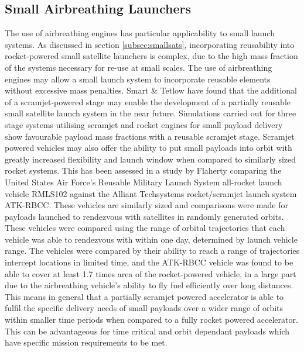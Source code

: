   

\subsection{Small Airbreathing Launchers}

The use of airbreathing engines has particular applicability to small launch systems. As discussed in section \ref{subsec:smallsats}, incorporating reusability into rocket-powered small satellite launchers is complex, due to the high mass fraction of the systems necessary for re-use at small scales. 
The use of airbreathing engines may allow a small launch system to incorporate reusable elements without excessive mass penalties. 
   Smart \& Tetlow\cite{Smart2009} have found that the additional of a scramjet-powered stage may enable the development of a partially reusable small satellite launch system in the near future. 
Simulations carried out for three stage systems utilising scramjet and rocket engines for small payload delivery show favourable payload mass fractions with a reusable scramjet stage\cite{Smart2009}. Scramjet powered vehicles may also offer the ability to put small payloads into orbit with greatly increased flexibility and launch window when compared to similarly sized rocket systems. This has been assessed in a study by Flaherty\cite{Flaherty2010} comparing the United States Air Force's Reusable Military Launch System all-rocket launch vehicle RMLS102 against the Alliant Techsystems rocket/scramjet launch system ATK-RBCC. These vehicles are similarly sized and comparisons were made for payloads launched to rendezvous with satellites in randomly generated orbits\cite{Flaherty2010}. These vehicles were compared using the range of orbital trajectories that each vehicle was able to rendezvous with within one day, determined by launch vehicle range\cite{Flaherty2010}. The vehicles were compared by their ability to reach a range of trajectories intercept locations in limited time, and the ATK-RBCC vehicle was found to be able to cover at least 1.7 times area of the rocket-powered vehicle\cite{Flaherty2010}, in a large part due to the airbreathing vehicle's ability to fly fuel efficiently over long distances. This means in general that a partially scramjet powered accelerator is able to fulfil the specific delivery needs of small payloads over a wider range of orbits within smaller time periods when compared to a fully rocket powered accelerator. This can be advantageous for time critical and orbit dependant payloads which have specific mission requirements to be met. 




